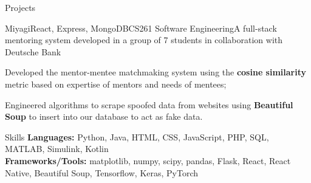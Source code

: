 \documentclass{resume}
\begin{document}
    \begin{rSection}{Projects}
        \begin{rSubsection}{Miyagi}{React, Express, MongoDB}{CS261 Software Engineering}{}{A full-stack mentoring system developed in a group of 7 students in collaboration with Deutsche Bank}
            \item Developed the mentor-mentee matchmaking system using the \textbf{cosine similarity} metric based on expertise of mentors and needs of mentees;
            \item Engineered algorithms to scrape spoofed data from websites using \textbf{Beautiful Soup} to insert into our database to act as fake data.
        \end{rSubsection}
    \end{rSection}
    \begin{rSection}{Skills}
        \textbf{Languages:} Python, Java, HTML, CSS, JavaScript, PHP, SQL, MATLAB, Simulink, Kotlin\\
        \textbf{Frameworks/Tools:} matplotlib, numpy, scipy, pandas, Flask, React, React Native, Beautiful Soup, Tensorflow, Keras, PyTorch \\ 
    \end{rSection}
\end{document}
